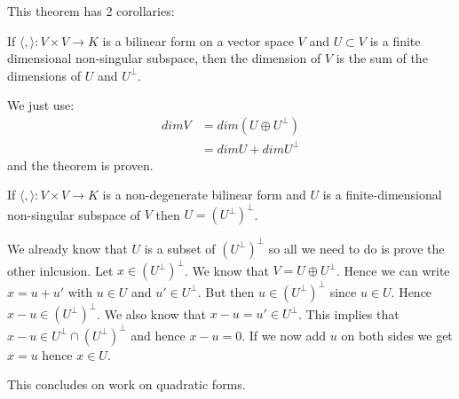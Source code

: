 \documentclass[../Thesis.tex]{subfiles}
\begin{document}
This theorem has 2 corollaries:
\begin{Cor}
If $\langle , \rangle : V \times V \rightarrow K$ is a bilinear form on a vector space $V$ and $U \subset V$ is a finite dimensional non-singular subspace, then the dimension of $V$ is the sum of the dimensions of $U$ and $U^\perp$.
\end{Cor}
\begin{myproof}
We just use:
\begin{align*}
dim V &= dim (U \oplus U^\perp) \\
      &= dim U + dim U^\perp
\end{align*}
and the theorem is proven.
\end{myproof}
\begin{Cor}
If $\langle , \rangle : V \times V \rightarrow K$ is a non-degenerate bilinear form and $U$ is a finite-dimensional non-singular subspace of $V$ then $U = (U^\perp)^\perp$.
\end{Cor}
\begin{myproof}
We already know that $U$ is a subset of $(U^\perp)^\perp$ so all we need to do is prove the other inlcusion. Let $x \in (U^\perp)^\perp$. We know that $V = U \oplus U^\perp$. Hence we can write $ x = u + u'$ with $u \in U$ and $u'\in U^\perp$. But then $u \in (U^\perp)^\perp$  since $u \in U$. Hence $x - u \in (U^\perp)^\perp$. We also know that $ x - u = u'\in U^\perp$. This implies that $x - u \in U^\perp \cap (U^\perp)^\perp$ and hence $ x - u = 0$. If we now add $u$ on both sides we get $x = u$ hence $ x \in U$.
\end{myproof}
This concludes on work on quadratic forms.
\end{document}
